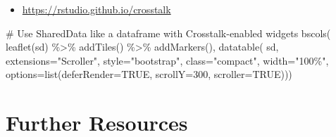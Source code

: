 \documentclass[
  letterpaper,
  DIV=11,
  numbers=noendperiod]{scrreprt}
\newenvironment{Shaded}{\begin{snugshade}}{\end{snugshade}}
\newcommand{\AttributeTok}[1]{\textcolor[rgb]{0.40,0.45,0.13}{#1}}
\newcommand{\CommentTok}[1]{\textcolor[rgb]{0.37,0.37,0.37}{#1}}
\newcommand{\ConstantTok}[1]{\textcolor[rgb]{0.56,0.35,0.01}{#1}}
\newcommand{\DecValTok}[1]{\textcolor[rgb]{0.68,0.00,0.00}{#1}}
\newcommand{\FloatTok}[1]{\textcolor[rgb]{0.68,0.00,0.00}{#1}}
\newcommand{\FunctionTok}[1]{\textcolor[rgb]{0.28,0.35,0.67}{#1}}
\newcommand{\NormalTok}[1]{\textcolor[rgb]{0.00,0.23,0.31}{#1}}
\newcommand{\OtherTok}[1]{\textcolor[rgb]{0.00,0.23,0.31}{#1}}
\newcommand{\SpecialCharTok}[1]{\textcolor[rgb]{0.37,0.37,0.37}{#1}}
\newcommand{\StringTok}[1]{\textcolor[rgb]{0.13,0.47,0.30}{#1}}
\providecommand{\tightlist}{%
  \setlength{\itemsep}{0pt}\setlength{\parskip}{0pt}}\usepackage{longtable,booktabs,array}
\begin{document}
\begin{itemize}
\tightlist
\item
  \url{https://rstudio.github.io/crosstalk}
\end{itemize}

\begin{Shaded}
\end{Shaded}

\begin{Shaded}
\begin{Highlighting}[]
\CommentTok{\# Use SharedData like a dataframe with Crosstalk{-}enabled widgets}
\FunctionTok{bscols}\NormalTok{(}
  \FunctionTok{leaflet}\NormalTok{(sd) }\SpecialCharTok{\%\textgreater{}\%} 
    \FunctionTok{addTiles}\NormalTok{() }\SpecialCharTok{\%\textgreater{}\%} 
    \FunctionTok{addMarkers}\NormalTok{(),}
  \FunctionTok{datatable}\NormalTok{(}
\NormalTok{    sd, }\AttributeTok{extensions=}\StringTok{"Scroller"}\NormalTok{, }\AttributeTok{style=}\StringTok{"bootstrap"}\NormalTok{, }\AttributeTok{class=}\StringTok{"compact"}\NormalTok{, }\AttributeTok{width=}\StringTok{"100\%"}\NormalTok{,}
    \AttributeTok{options=}\FunctionTok{list}\NormalTok{(}\AttributeTok{deferRender=}\ConstantTok{TRUE}\NormalTok{, }\AttributeTok{scrollY=}\DecValTok{300}\NormalTok{, }\AttributeTok{scroller=}\ConstantTok{TRUE}\NormalTok{)))}
\end{Highlighting}
\end{Shaded}

\hypertarget{further-resources}{%
\section*{Further Resources}\label{further-resources}}
\end{document}
